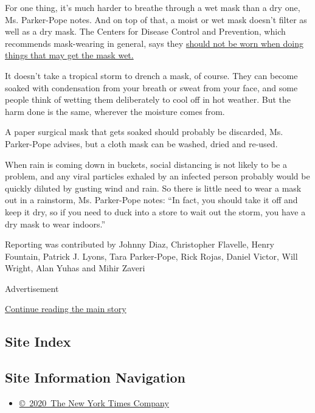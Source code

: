 For one thing, it's much harder to breathe through a wet mask than a dry
one, Ms. Parker-Pope notes. And on top of that, a moist or wet mask
doesn't filter as well as a dry mask. The Centers for Disease Control
and Prevention, which recommends mask-wearing in general, says they
\href{https://www.cdc.gov/coronavirus/2019-ncov/prevent-getting-sick/cloth-face-cover-guidance.html}{should
not be worn when doing things that may get the mask wet. }

It doesn't take a tropical storm to drench a mask, of course. They can
become soaked with condensation from your breath or sweat from your
face, and some people think of wetting them deliberately to cool off in
hot weather. But the harm done is the same, wherever the moisture comes
from.

A paper surgical mask that gets soaked should probably be discarded, Ms.
Parker-Pope advises, but a cloth mask can be washed, dried and re-used.

When rain is coming down in buckets, social distancing is not likely to
be a problem, and any viral particles exhaled by an infected person
probably would be quickly diluted by gusting wind and rain. So there is
little need to wear a mask out in a rainstorm, Ms. Parker-Pope notes:
``In fact, you should take it off and keep it dry, so if you need to
duck into a store to wait out the storm, you have a dry mask to wear
indoors.''

Reporting was contributed by Johnny Diaz, Christopher Flavelle, Henry
Fountain, Patrick J. Lyons, Tara Parker-Pope, Rick Rojas, Daniel Victor,
Will Wright, Alan Yuhas and Mihir Zaveri

Advertisement

\protect\hyperlink{after-bottom}{Continue reading the main story}

\hypertarget{site-index}{%
\subsection{Site Index}\label{site-index}}

\hypertarget{site-information-navigation}{%
\subsection{Site Information
Navigation}\label{site-information-navigation}}

\begin{itemize}
\tightlist
\item
  \href{https://help.nytimes3xbfgragh.onion/hc/en-us/articles/115014792127-Copyright-notice}{©~2020~The
  New York Times Company}
\end{itemize}

